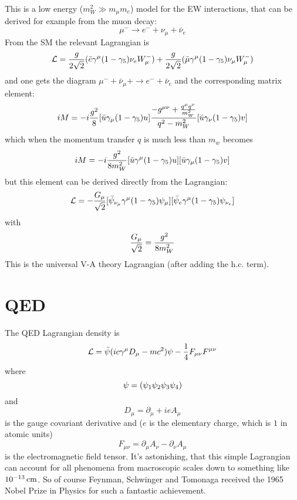 This is a low energy ($m_W^2 \gg m_\mu m_e$) model for the EW interactions, that can be derived for example from the muon decay: 
\begin{equation*}
  \mu^- \to e^- +\nu_\mu + \bar \nu_e
\end{equation*}
From the SM the relevant Lagrangian is 
\begin{equation*}
  {\mathcal L} = {g\over2\sqrt2}(\bar e \gamma^\mu (1-\gamma_5) \nu_e W^-_\mu) + {g\over2\sqrt2}(\bar \mu \gamma^\mu (1-\gamma_5) \nu_\mu W^-_\mu)
\end{equation*}
and one gets the diagram $\mu^- +\bar\nu_\mu+ \to e^- + \bar \nu_e$ and the corresponding matrix element: 
\begin{equation*}
  iM = -i{g^2\over8}[\bar u\gamma_\mu (1-\gamma_5) u] {-g^{\mu\nu}+{q^\mu q^\nu\over m_W^2}\over q^2 - m_W^2} [\bar u\gamma_\nu (1-\gamma_5) v]
\end{equation*}
which when the momentum transfer $q$ is much less than $m_w$ becomes 
\begin{equation*}
  iM = -i{g^2\over8m_W^2}[\bar u\gamma^\mu (1-\gamma_5) u] [\bar u\gamma_\mu (1-\gamma_5) v]
\end{equation*}
but this element can be derived directly from the Lagrangian: 
\begin{equation*}
  {\mathcal L} = -{G_\mu\over\sqrt2} [\bar \psi_{\nu_\mu}\gamma^\mu (1-\gamma_5) \psi_\mu] [\bar \psi_e\gamma^\mu (1-\gamma_5) \psi_{\nu_e}]
\end{equation*}
with 
\begin{equation*}
  {G_\mu\over\sqrt2} = {g^2\over8m_W^2}
\end{equation*}
This is the universal V-A theory Lagrangian (after adding the h.c. term).

\section{QED}

The QED Lagrangian density is 
\begin{equation*}
  {\mathcal L}=\bar\psi(ic\gamma^\mu D_\mu-mc^2)\psi-{1\over4}F_{\mu\nu}F^{\mu\nu}
\end{equation*}
where 
\begin{equation*}
  \psi=\left({\psi_1\psi_2\psi_3\psi_4}\right)
\end{equation*}
and 
\begin{equation*}
  D_\mu=\partial_\mu+ieA_\mu
\end{equation*}
is the gauge covariant derivative and ($e$ is the elementary charge, which is $1$ in atomic units) 
\begin{equation*}
  F_{\mu\nu}=\partial_\mu A_\nu-\partial_\nu A_\mu
\end{equation*}
is the electromagnetic field tensor. It's astonishing, that this simple Lagrangian can account for all phenomena from macroscopic scales down to something like $10^{-13}\rm\,cm$. So of course Feynman, Schwinger and Tomonaga received the 1965 Nobel Prize in Physics for such a fantastic achievement.


